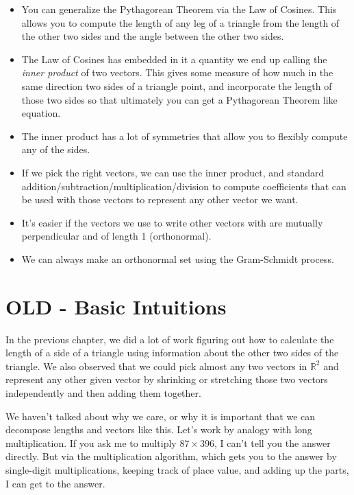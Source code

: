 \documentclass[
]{book}
\providecommand{\tightlist}{%
  \setlength{\itemsep}{0pt}\setlength{\parskip}{0pt}}
\begin{document}
\begin{itemize}
\tightlist
\item
  You can generalize the Pythagorean Theorem via the Law of Cosines. This allows you to compute the length of any leg of a triangle from the length of the other two sides and the angle between the other two sides.
\item
  The Law of Cosines has embedded in it a quantity we end up calling the \emph{inner product} of two vectors. This gives some measure of how much in the same direction two sides of a triangle point, and incorporate the length of those two sides so that ultimately you can get a Pythagorean Theorem like equation.
\item
  The inner product has a lot of symmetries that allow you to flexibly compute any of the sides.
\item
  If we pick the right vectors, we can use the inner product, and standard addition/subtraction/multiplication/division to compute coefficients that can be used with those vectors to represent any other vector we want.
\item
  It's easier if the vectors we use to write other vectors with are mutually perpendicular and of length 1 (orthonormal).
\item
  We can always make an orthonormal set using the Gram-Schmidt process.
\end{itemize}

\hypertarget{old---basic-intuitions}{%
\chapter{OLD - Basic Intuitions}\label{old---basic-intuitions}}

In the previous chapter, we did a lot of work figuring out how to calculate the length of a side of a triangle using information about the other two sides of the triangle. We also observed that we could pick almost any two vectors in \(\mathbb{R}^2\) and represent any other given vector by shrinking or stretching those two vectors independently and then adding them together.

We haven't talked about why we care, or why it is important that we can decompose lengths and vectors like this. Let's work by analogy with long multiplication. If you ask me to multiply \(87 \times 396\), I can't tell you the answer directly. But via the multiplication algorithm, which gets you to the answer by single-digit multiplications, keeping track of place value, and adding up the parts, I can get to the answer.
\end{document}
